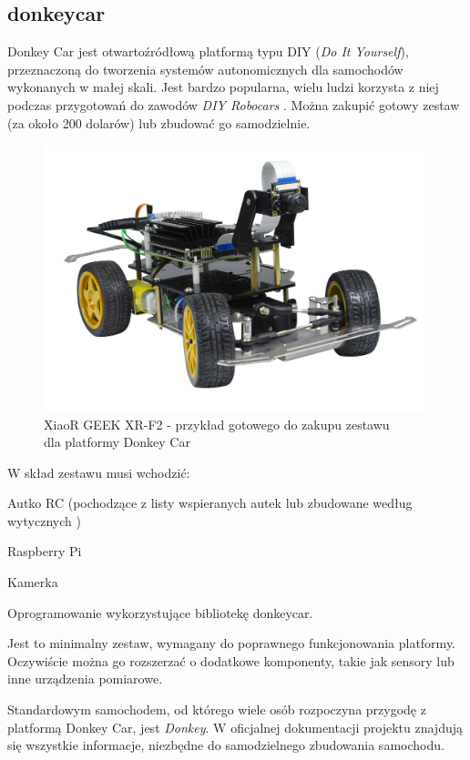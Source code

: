\subsection{donkeycar}
Donkey Car jest otwartoźródłową platformą typu DIY (\textit{Do It Yourself}), przeznaczoną do tworzenia systemów autonomicznych dla samochodów wykonanych w małej skali. Jest bardzo popularna, wielu ludzi korzysta z niej podczas przygotowań do zawodów \textit{DIY Robocars} \cite{diyrobocars:website}. Można zakupić gotowy zestaw (za około 200 dolarów) lub zbudować go samodzielnie.
\begin{figure}[H]
\centering
\includegraphics[width=15cm]{resources/figures/donkeycar_example.png}
\caption{XiaoR GEEK XR-F2 - przykład gotowego do zakupu zestawu \\dla platformy Donkey Car}
\label{DonkeycarExample}
\end{figure}
\newpage
W skład zestawu musi wchodzić:
\begin{enumerate*}
\item Autko RC (pochodzące z listy wspieranych autek \cite{donkeyCar:supportedCars} lub zbudowane według wytycznych \cite{donkeyCar:rollYourOwn})
\item Raspberry Pi \cite{raspberrypi:overview}
\item Kamerka
\item Oprogramowanie wykorzystujące bibliotekę donkeycar.
\end{enumerate*}
Jest to minimalny zestaw, wymagany do poprawnego funkcjonowania platformy. Oczywiście można go rozszerzać o dodatkowe komponenty, takie jak sensory lub inne urządzenia pomiarowe.

Standardowym samochodem, od którego wiele osób rozpoczyna przygodę z platformą Donkey Car, jest \textit{Donkey}.
W oficjalnej dokumentacji projektu \cite{donkeycar:docs} znajdują się wszystkie informacje, niezbędne do samodzielnego zbudowania samochodu.

